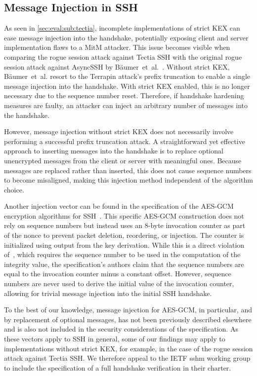 \subsection{Message Injection in SSH}

As seen in \autoref{sec:eval:sub:tectia}, incomplete implementations of strict KEX can ease message injection into the handshake, potentially exposing client and server implementation flaws to a MitM attacker. This issue becomes visible when comparing the rogue session attack against Tectia SSH with the original rogue session attack against AsyncSSH by Bäumer~et~al.~\cite{USENIX:BauBriSch24}. Without strict KEX, Bäumer~et~al. resort to the Terrapin attack's prefix truncation to enable a single message injection into the handshake. With strict KEX enabled, this is no longer necessary due to the sequence number reset. Therefore, if handshake hardening measures are faulty, an attacker can inject an arbitrary number of messages into the handshake.

However, message injection without strict KEX does not necessarily involve performing a successful prefix truncation attack. A straightforward yet effective approach to inserting messages into the handshake is to replace optional unencrypted messages from the client or server with meaningful ones. Because messages are replaced rather than inserted, this does not cause sequence numbers to become misaligned, making this injection method independent of the algorithm choice.

Another injection vector can be found in the specification of the AES-GCM encryption algorithms for SSH~\cite{rfc5647}. This specific AES-GCM construction does not rely on sequence numbers but instead uses an 8-byte invocation counter as part of the nonce to prevent packet deletion, reordering, or injection. The counter is initialized using output from the key derivation. While this is a direct violation of~\cite{rfc4253}, which requires the sequence number to be used in the computation of the integrity value, the specification's authors claim that the sequence numbers are equal to the invocation counter minus a constant offset. However, sequence numbers are never used to derive the initial value of the invocation counter, allowing for trivial message injection into the initial SSH handshake.

To the best of our knowledge, message injection for AES-GCM, in particular, and by replacement of optional messages, has not been previously described elsewhere and is also not included in the security considerations of the specification. As these vectors apply to SSH in general, some of our findings may apply to implementations without strict KEX, for example, in the case of the rogue session attack against Tectia SSH. We therefore appeal to the IETF sshm working group to include the specification of a full handshake verification in their charter.

